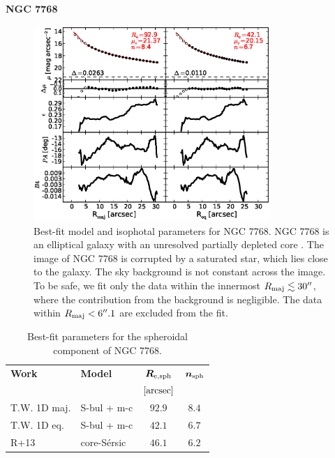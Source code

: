 \documentclass[preprint2]{emulateapj}
\newcommand{\fitfigurewidth}{0.8\textwidth}
\begin{document}
  \clearpage\newpage\noindent
  {\bf NGC 7768 \\}

  \begin{figure}[h]
  \begin{center}
  \includegraphics[width=\fitfigurewidth]{images/n7768_1Dfit.eps}
  \caption{Best-fit model and isophotal parameters for NGC 7768.
  NGC 7768 is an elliptical galaxy with an unresolved partially depleted core \citep{rusli2013}. %
  The image of NGC 7768 is corrupted by a saturated star, which lies close to the galaxy.
  The sky background is not constant across the image.
  To be safe, we fit only the data within the innermost $R_{\rm maj} \lesssim 30''$, where the contribution from the background is negligible.
  The data within $R_{\rm maj} < 6''.1$ are excluded from the fit.
  }
  \end{center}
  \end{figure}

  \begin{table}[h]
  \small
  \caption{Best-fit parameters for the spheroidal component of NGC 7768.}
  \begin{center}
  \begin{tabular}{llcc}
  \hline
  {\bf Work} & {\bf Model}   & $\bm R_{\rm e,sph}$    & $\bm n_{\rm sph}$ \\
    &  &  $[\rm arcsec]$ & \\
  \hline
  T.W. 1D maj. & S-bul + m-c & $92.9$  &  $8.4$ \\
  T.W. 1D eq.  & S-bul + m-c & $42.1$  &  $6.7$ \\
  \hline
  R+13      & core-S\'ersic & $46.1$  &  $6.2$ \\
  \hline
  \end{tabular}
  \end{center}
  \label{tab:n7768}
  \end{table}
   
\end{document}
